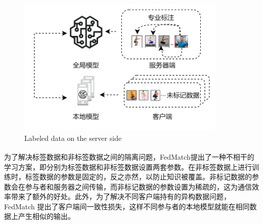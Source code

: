 \begin{figure}[H]
	\centering
	\includegraphics[width=10cm]{chapters/imgs/LabelAtServer}
	{\wuhao Labeled data on the server side}
	\label{LabelAtServer}
\end{figure}
\vspace{-0.35cm}

为了解决标签数据和非标签数据之间的隔离问题，FedMatch\textsuperscript{\cite{jeong2020federated}}提出了一种不相干的学习方案，即分别为标签数据和非标签数据设置两套参数。在非标签数据上进行训练时，标签数据的参数是固定的，反之亦然，以防止知识被覆盖。非标记数据的参数会在参与者和服务器之间传输，而非标记数据的参数设置为稀疏的，这为通信效率带来了额外的好处。此外，为了解决不同客户端持有的异构数据问题，FedMatch 提出了客户端间一致性损失，这样不同参与者的本地模型就能在相同数据上产生相似的输出。

